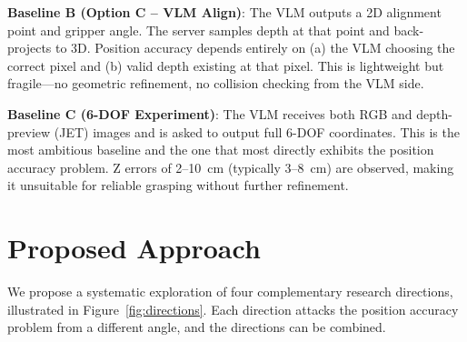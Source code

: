 \documentclass[11pt,a4paper]{article}
\begin{document}
\textbf{Baseline B (Option C -- VLM Align)}: The VLM outputs a 2D alignment point and gripper angle. The server samples depth at that point and back-projects to 3D. Position accuracy depends entirely on (a) the VLM choosing the correct pixel and (b) valid depth existing at that pixel. This is lightweight but fragile---no geometric refinement, no collision checking from the VLM side.

\textbf{Baseline C (6-DOF Experiment)}: The VLM receives both RGB and depth-preview (JET) images and is asked to output full 6-DOF coordinates. This is the most ambitious baseline and the one that most directly exhibits the position accuracy problem. Z errors of 2--10~cm (typically 3--8~cm) are observed, making it unsuitable for reliable grasping without further refinement.

\section{Proposed Approach}

We propose a systematic exploration of four complementary research directions, illustrated in Figure~\ref{fig:directions}. Each direction attacks the position accuracy problem from a different angle, and the directions can be combined.
\end{document}
